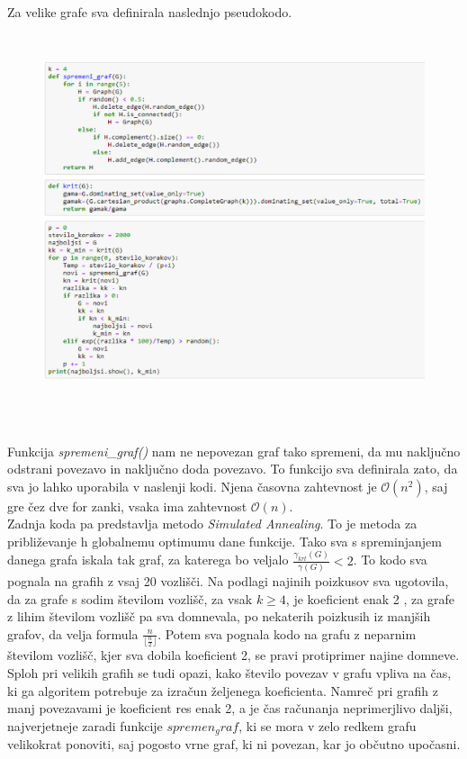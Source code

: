 \documentclass[a4paper]{article}
\begin{document}
Za velike grafe sva definirala naslednjo pseudokodo.
\begin{figure}[h!]
    \centering
    \includegraphics[width=13cm, height=11cm]{Slika4}
    \label{fig:mesh1}
\end{figure}\\
Funkcija \textit{spremeni\_graf()} nam ne nepovezan graf tako spremeni, da mu naključno odstrani povezavo in naključno doda povezavo. To funkcijo sva definirala zato, da sva jo lahko uporabila v naslenji kodi. Njena časovna zahtevnost je $\mathcal{O}(n^2)$, saj gre čez dve for zanki, vsaka ima zahtevnost $\mathcal{O}(n)$.\\
Zadnja koda pa predstavlja metodo \textit{Simulated Annealing}. To je metoda za približevanje h globalnemu optimumu dane funkcije. Tako sva s spreminjanjem danega grafa iskala tak graf, za katerega bo veljalo $\frac{\gamma_{krt}(G)}{\gamma(G)} < 2$. To kodo sva pognala na grafih z vsaj 20 vozlišči. Na podlagi najinih poizkusov sva ugotovila, da za grafe s sodim številom vozlišč, za vsak $k \ge 4$, je koeficient enak 2 , za grafe z lihim številom vozlišč pa sva domnevala, po nekaterih poizkusih iz manjših grafov, da velja formula $\frac{n}{\lfloor{\frac{n}{2}}\rfloor}$. Potem sva pognala kodo na grafu z neparnim številom vozlišč, kjer sva dobila koeficient 2, se pravi protiprimer najine domneve. Sploh pri velikih grafih se tudi opazi, kako število povezav v grafu vpliva na čas, ki ga algoritem potrebuje za izračun željenega koeficienta. Namreč pri grafih z manj povezavami je koeficient res enak 2, a je čas računanja neprimerjlivo daljši, najverjetneje zaradi funkcije $spremen_graf$, ki se mora v zelo redkem grafu velikokrat ponoviti, saj pogosto vrne graf, ki ni povezan, kar jo občutno upočasni. \\
\pagebreak
\end{document}
